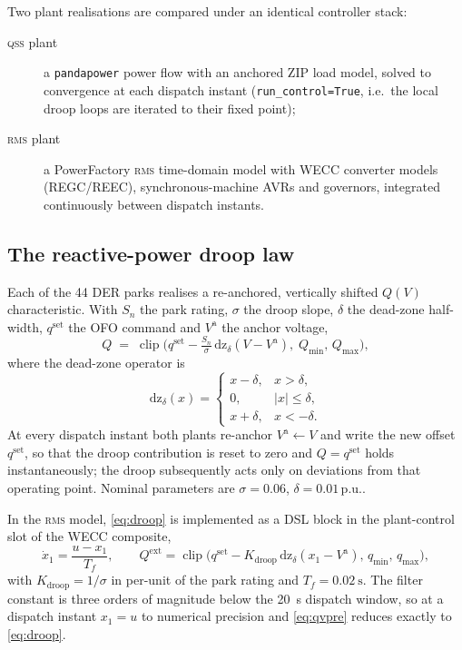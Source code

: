\documentclass[11pt,a4paper]{article}
\newcommand{\pu}{\ensuremath{\mathrm{p.u.}}}
\newcommand{\qss}{\textsc{qss}}
\newcommand{\rms}{\textsc{rms}}
\begin{document}
Two plant realisations are compared under an identical controller stack:

\begin{description}
  \item[\qss{} plant] a \texttt{pandapower} power flow with an anchored ZIP
        load model, solved to convergence at each dispatch instant
        (\texttt{run\_control=True}, i.e.\ the local droop loops are iterated
        to their fixed point);
  \item[\rms{} plant] a PowerFactory \rms{} time-domain model with WECC
        converter models (REGC/REEC), synchronous-machine AVRs and
        governors, integrated continuously between dispatch instants.
\end{description}

\subsection{The reactive-power droop law}

Each of the 44 DER parks realises a re-anchored, vertically shifted $Q(V)$
characteristic. With $S_n$ the park rating, $\sigma$ the droop slope,
$\delta$ the dead-zone half-width, $q^{\mathrm{set}}$ the OFO command and
$V^{\mathrm{a}}$ the anchor voltage,
%
\begin{equation}
  Q \;=\; \operatorname{clip}\!\Big(
    q^{\mathrm{set}} - \tfrac{S_n}{\sigma}\,
    \mathrm{dz}_{\delta}\!\left(V - V^{\mathrm{a}}\right),\;
    Q_{\min},\, Q_{\max}\Big),
  \label{eq:droop}
\end{equation}
%
where the dead-zone operator is
%
\begin{equation}
  \mathrm{dz}_{\delta}(x) =
  \begin{cases}
    x-\delta, & x > \delta,\\
    0, & |x| \le \delta,\\
    x+\delta, & x < -\delta .
  \end{cases}
  \label{eq:deadzone}
\end{equation}
%
At every dispatch instant both plants re-anchor $V^{\mathrm{a}} \leftarrow V$
and write the new offset $q^{\mathrm{set}}$, so that the droop contribution
is reset to zero and $Q = q^{\mathrm{set}}$ holds instantaneously; the droop
subsequently acts only on deviations from that operating point. Nominal
parameters are $\sigma = 0.06$, $\delta = 0.01\,\pu$.

In the \rms{} model, \eqref{eq:droop} is implemented as a DSL block in the
plant-control slot of the WECC composite,
%
\begin{equation}
  \dot{x}_1 = \frac{u - x_1}{T_f}, \qquad
  Q^{\mathrm{ext}} = \operatorname{clip}\!\big(
  q^{\mathrm{set}} - K_{\mathrm{droop}}\,
  \mathrm{dz}_{\delta}(x_1 - V^{\mathrm{a}}),\,
  q_{\min},\, q_{\max}\big),
  \label{eq:qvpre}
\end{equation}
%
with $K_{\mathrm{droop}} = 1/\sigma$ in per-unit of the park rating and
$T_f = \SI{0.02}{\second}$. The filter constant is three orders of magnitude
below the \SI{20}{\second} dispatch window, so at a dispatch instant
$x_1 = u$ to numerical precision and \eqref{eq:qvpre} reduces exactly to
\eqref{eq:droop}.
\end{document}
